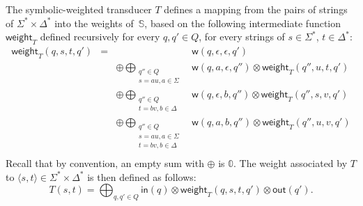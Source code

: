 \documentclass[runningheads]{llncs}
\def\<#1>{\langle #1 \rangle}
\newcommand{\Semiring}{\mathbb{S}}
\newcommand{\zero}{\mathbb{0}}
\def\weight{\mathsf{weight}}
\def\wei{\mathsf{w}}
\begin{document}
The symbolic-weighted transducer $T$ defines a mapping 
from the pairs of strings of $\Sigma^* \times \Delta^*$ 
into the weights of~$\Semiring$,
based on the following intermediate function $\weight_T$
defined recursively for every $q, q' \in Q$, 
for every strings of $s \in \Sigma^*$, $t \in \Delta^*$:
\[
\begin{array}{rccl}
\weight_T(q, s, t, q') & = & & \wei(q, \epsilon, \epsilon, q')\\
 & & \oplus \displaystyle\bigoplus_{\begin{array}{c}
                                      \scriptstyle q'' \in Q\\[-2pt]
                                      \scriptstyle s = au, a \in \Sigma
                                      \end{array}} &
     \wei(q, a, \epsilon, q'') \otimes \weight_T(q'', u, t, q')\\
 & & \oplus \displaystyle\bigoplus_{\begin{array}{c}
                                    \scriptstyle q'' \in Q\\[-2pt]
                                    \scriptstyle t = bv, b \in \Delta
                                    \end{array}} &
      \wei(q, \epsilon, b, q'') \otimes \weight_T(q'', s, v, q')\\ 
      & & \oplus \displaystyle\bigoplus_{\begin{array}{c}
                                         \scriptstyle q'' \in Q\\[-2pt]
                                         \scriptstyle s = au, a \in \Sigma\\[-2pt]
                                         \scriptstyle t = bv, b \in \Delta
                                         \end{array}} &
      \wei(q, a, b, q'') \otimes \weight_T(q'', u, v, q')\\ 
\end{array}
\]
Recall that by convention, an empty sum with $\oplus$ is $\zero$. 
%
\noindent
The weight associated by $T$ to  $\< s, t> \in \Sigma^* \times \Delta^*$
is then defined as follows: 
\begin{equation}
T(s, t)  = 
\displaystyle\bigoplus_{q, q' \in Q} \mathsf{in}(q) 
\mathop{\otimes} \weight_T(q, s, t, q') \mathop{\otimes} \mathsf{out}(q').
\label{eq:weightT}
\end{equation}
\end{document}
